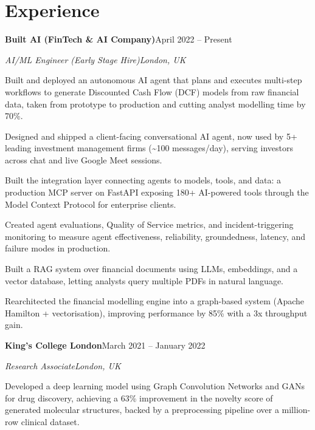 \documentclass[10pt,a4paper]{article}
\newcommand{\entry}[4]{%
  {\color{company}\bfseries #1}\hfill {\color{muted}#2}\par
  \vspace{1pt}
  {\itshape #3}\hfill {\color{muted}\itshape #4}\par
  \vspace{3pt}%
}
\begin{document}
\section{Experience}
\entry{Built AI (FinTech \& AI Company)}{April 2022 -- Present}{AI/ML Engineer (Early Stage Hire)}{London, UK}
\begin{tight}
  \item Built and deployed an autonomous AI agent that plans and executes multi-step workflows to generate Discounted Cash Flow (DCF) models from raw financial data, taken from prototype to production and cutting analyst modelling time by 70\%.
  \item Designed and shipped a client-facing conversational AI agent, now used by 5+ leading investment management firms (\textasciitilde100 messages/day), serving investors across chat and live Google Meet sessions.
  \item Built the integration layer connecting agents to models, tools, and data: a production MCP server on FastAPI exposing 180+ AI-powered tools through the Model Context Protocol for enterprise clients.
  \item Created agent evaluations, Quality of Service metrics, and incident-triggering monitoring to measure agent effectiveness, reliability, groundedness, latency, and failure modes in production.
  \item Built a RAG system over financial documents using LLMs, embeddings, and a vector database, letting analysts query multiple PDFs in natural language.
  \item Rearchitected the financial modelling engine into a graph-based system (Apache Hamilton + vectorisation), improving performance by 85\% with a 3x throughput gain.
\end{tight}

\entry{King's College London}{March 2021 -- January 2022}{Research Associate}{London, UK}
\begin{tight}
  \item Developed a deep learning model using Graph Convolution Networks and GANs for drug discovery, achieving a 63\% improvement in the novelty score of generated molecular structures, backed by a preprocessing pipeline over a million-row clinical dataset.
\end{tight}

\end{document}

